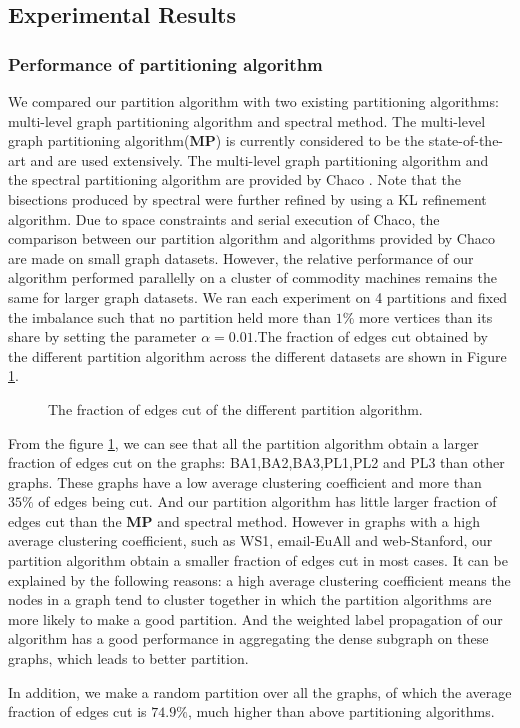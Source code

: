 \documentclass{acm_proc_article-sp}
\begin{document}
\subsection{Experimental Results}
\subsubsection{Performance of partitioning algorithm}
We compared our partition algorithm with two existing partitioning algorithms: multi-level graph partitioning algorithm and spectral method.
The multi-level graph partitioning algorithm(\textbf{MP}) is currently considered to be the state-of-the-art and are used extensively. The multi-level graph partitioning algorithm and the spectral partitioning algorithm are provided by Chaco \cite{Hendrickson_Leland_1994}. Note that the bisections produced by spectral were further refined by using a KL refinement algorithm. Due to space constraints and serial execution of Chaco, the comparison between our partition algorithm and algorithms provided by Chaco are made on small graph datasets. However, the relative performance of our algorithm performed parallelly on a cluster of commodity machines remains the same for larger graph datasets. We ran each experiment on 4 partitions and fixed the imbalance such that no partition held more than $1\%$ more vertices than its share by setting the parameter $\alpha=0.01$.The fraction of edges cut obtained by the different partition algorithm across the different datasets are shown in Figure \ref{fig:per}.
\begin{figure}
\centering
{}
\caption{The fraction of edges cut of the different partition algorithm.}
\label{fig:per}
\end{figure}
\par
From the figure \ref{fig:per}, we can see that all the partition algorithm obtain a larger fraction of edges cut on the graphs: BA1,BA2,BA3,PL1,PL2 and PL3 than other graphs. These graphs have a low average clustering coefficient and more than $35\%$ of edges being cut. And our partition algorithm has little larger fraction of edges cut than the \textbf{MP} and spectral method. However in graphs with a high average clustering coefficient, such as WS1, email-EuAll and web-Stanford, our partition algorithm obtain a smaller fraction of edges cut in most cases. It can be explained by the following reasons: a high average clustering coefficient means the nodes in a graph tend to cluster together in which the partition algorithms are more likely to make a good partition. And the weighted label propagation of our algorithm has a good performance in aggregating the dense subgraph on these graphs, which leads to better partition.
\par
In addition, we make a random partition over all the graphs, of which the average fraction of edges cut is $74.9\%$, much higher than above partitioning algorithms.
\end{document}
